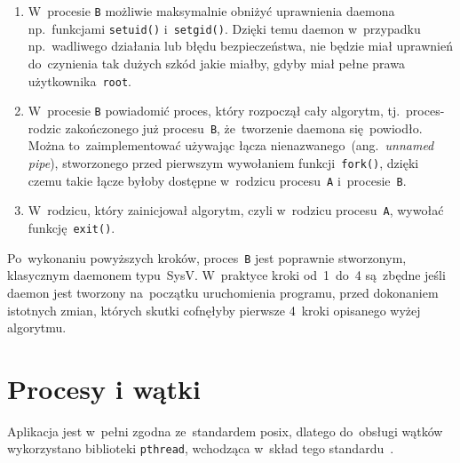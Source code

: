 \documentclass[thesis]{subfiles}
\begin{document}
\begin{enumerate}
	\item W~procesie \texttt{B} możliwie maksymalnie obniżyć uprawnienia daemona np.~funkcjami \texttt{setuid()} i~\texttt{setgid()}. Dzięki temu daemon w~przypadku np.~wadliwego działania lub błędu bezpieczeństwa, nie będzie miał uprawnień do~czynienia tak dużych szkód jakie miałby, gdyby miał pełne prawa użytkownika~\texttt{root}.
	\item W~procesie \texttt{B} powiadomić proces, który rozpoczął cały algorytm, tj.~proces-rodzic zakończonego już procesu~\texttt{B}, że~tworzenie daemona się~powiodło. Można to~zaimplementować używając łącza nienazwanego~(ang.~\emph{unnamed pipe}), stworzonego przed pierwszym wywołaniem funkcji~\texttt{fork()}, dzięki czemu takie łącze byłoby dostępne w~rodzicu procesu~\texttt{A} i~procesie~\texttt{B}.
	\item W~rodzicu, który zainicjował algorytm, czyli w~rodzicu procesu~\texttt{A}, wywołać funkcję~\texttt{exit()}.
\end{enumerate}
Po~wykonaniu powyższych kroków, proces~\texttt{B} jest poprawnie stworzonym, klasycznym daemonem typu~SysV. W~praktyce kroki od~1~do~4 są~zbędne jeśli daemon jest tworzony na~początku uruchomienia programu, przed dokonaniem istotnych zmian, których skutki cofnęłyby pierwsze 4~kroki opisanego wyżej algorytmu.


\section{Procesy i wątki}

Aplikacja jest w~pełni zgodna ze~standardem \gls{posix}, dlatego do~obsługi wątków wykorzystano biblioteki \texttt{pthread}, wchodząca w~skład tego standardu~\cite{pthreads-posix-manual}.

\end{document}
